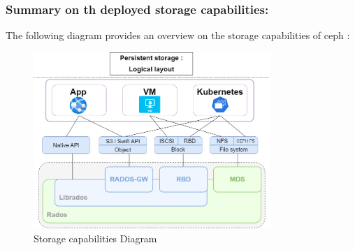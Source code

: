 \subsubsection{Summary on th deployed storage capabilities: }

The following diagram provides an overview on the storage capabilities of ceph : 
\begin{figure}[H]\centering
\includegraphics[width=0.8\textwidth,angle=00]{assets/f30.png}
\caption{Storage capabilities Diagram}
\label{fig:f30}
\end{figure}